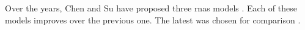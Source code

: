 
Over the years, Chen and Su have proposed three \glspl{rna}
models \textcite{chen2018functional,
chen2019functional,chen2021attend}. Each of these models
improves over the previous one. The latest was chosen for
comparison \textcite{chen2021attend}.

